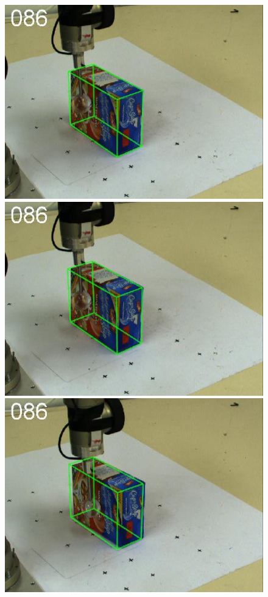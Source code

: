 \begin{figure}[htbp]
{\includegraphics[width=\imgAXwid]{images/A2_2exp_399_1}
\includegraphics[width=\imgAXwid]{images/A2_LWPR1_399_1}
\includegraphics[width=\imgAXwid]{images/A2_2exp_87_1}
}
\end{figure}
